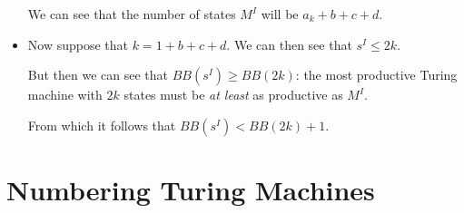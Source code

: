 \documentclass[justified]{tufte-handout}
\begin{document}
\begin{itemize}
\begin{itemize}
\end{itemize}

We can see that the number of states $M^I$ will be $a_k +b+ c+ d$.


\item Now suppose that $k = 1+ b+c+d$. We can then see that $s^I \leq 2k$.

\vspace{.2cm}

\noindent But then we can see that $BB(s^I)\geq BB(2k)$: the most productive Turing machine with $2k$ states must be \emph{at least} as productive as $M^I$. 

\vspace{.2cm}

\noindent From which it follows that $BB(s^I)<BB(2k)+1$.

\end{itemize}


\section{Numbering Turing Machines}
\end{document}
